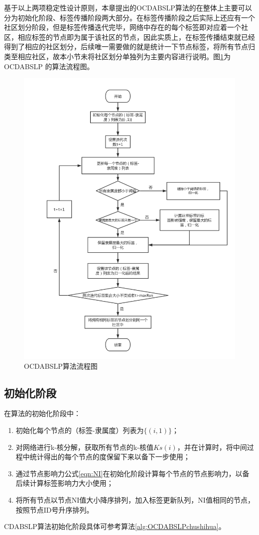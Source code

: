 基于以上两项稳定性设计原则，本章提出的OCDABSLP算法的在整体上主要可以分为初始化阶段、标签传播阶段两大部分。在标签传播阶段之后实际上还应有一个社区划分阶段，但是标签传播迭代完毕，网络中存在的每个标签即对应着一个社区，相应标签的节点即为属于该社区的节点，因此实质上，在标签传播结束就已经得到了相应的社区划分，后续唯一需要做的就是统计一下节点标签，将所有节点归类至相应社区，故本小节未将社区划分单独列为主要内容进行说明。图\ref{fig:ocdabslp}为 OCDABSLP 的算法流程图。

\begin{figure}
  \centering
  \includegraphics[width=1\textwidth]{figures/ocdabslp}
  \caption{OCDABSLP算法流程图}\label{fig:ocdabslp}
\end{figure}

\subsection{初始化阶段}

在算法的初始化阶段中：
\begin{enumerate}
  \item 初始化每个节点的（标签-隶属度）列表为$ \{ (i,1) \} $；
  \item 对网络进行k-核分解，获取所有节点的k-核值$Ks(i)$，并在计算时，将中间过程中统计得出的每个节点的度保留下来以备下一步使用；
  \item 通过节点影响力公式\ref{eqn:NI}在初始化阶段计算每个节点的节点影响力，以备后续计算标签影响力大小使用；
  \item 将所有节点以节点NI值大小降序排列，加入标签更新队列，NI值相同的节点，按照节点ID号升序排列。
\end{enumerate}
CDABSLP算法初始化阶段具体可参考算法\ref{alg:OCDABSLPchushihua}。

